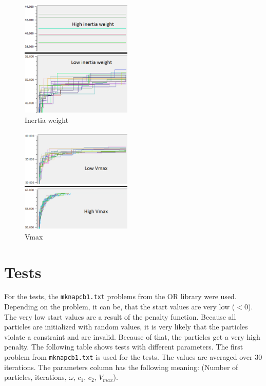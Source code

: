 \documentclass{article}
\begin{document}
\begin{figure}[H]
    \centering
    \includegraphics[width=200px]{images/inertia.PNG}
    \caption{Inertia weight}
    \label{fig-inertia}
\end{figure}

\begin{figure}[H]
    \centering
    \includegraphics[width=200px]{images/vmax.PNG}
    \caption{Vmax}
    \label{fig-vmax}
\end{figure}

\section{Tests}
\label{lbl-tests}
For the tests, the \lstinline$mknapcb1.txt$ problems from the OR library were used.  Depending on the problem, it can be, that the start values are very low ($< 0$). The very low start values are a result of the penalty function. Because all particles are initialized with random values, it is very likely that the particles violate a constraint and are invalid. Because of that, the particles get a very high penalty. The following table shows tests with different parameters. The first problem from \lstinline$mknapcb1.txt$ is used for the tests. The values are averaged over 30 iterations. The parameters column has the following meaning: (Number of particles, iterations, $\omega$, $c_1$, $c_2$, $V_{max}$). \\
\end{document}
